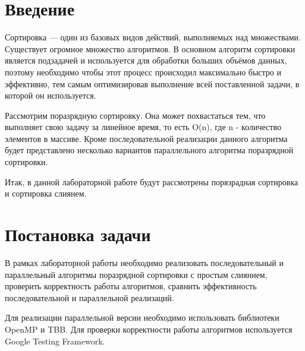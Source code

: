 \documentclass{report}
\begin{document}
\setcounter{page}{2}

\tableofcontents
\newpage

\section*{Введение}
\par Сортировка — один из базовых видов действий, выполняемых над множествами. Существует огромное множество алгоритмов. В основном алгоритм сортировки является подзадачей и используется для обработки больших объёмов данных, поэтому необходимо чтобы этот процесс происходил максимально быстро и эффективно, тем самым оптимизировав выполнение всей поставленной задачи, в которой он используется. 
\par Рассмотрим поразрядную сортировку. Она может похвастаться тем, что выполняет свою задачу за линейное время, то есть O(n), где n - количество элементов в массиве. Кроме последовательной реализации данного алгоритма будет представлено несколько вариантов параллельного алгоритма поразрядной сортировки.
\par Итак, в данной лабораторной работе будут рассмотрены порязрадная сортировка и сортировка слиянем.
\newpage

\section*{Постановка задачи}
В рамках лабораторной работы необходимо реализовать последовательный и параллельный алгоритмы поразрядной сортировки с простым слиянием, проверить корректность работы алгоритмов, сравнить эффективность последовательной и параллельной реализаций.
\par Для реализации параллельной версии необходимо использовать библиотеки OpenMP и TBB. Для проверки корректности работы алгоритмов используется Google Testing Framework.
\newpage

\end{document}
